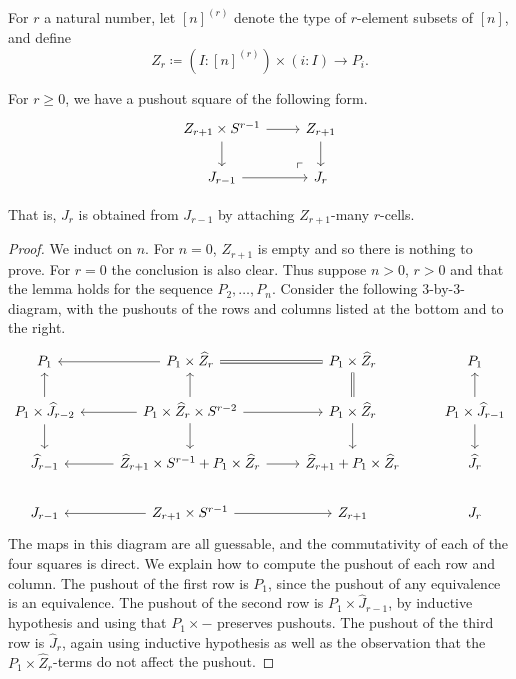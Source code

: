 \begin{definition}
For $r$ a natural number, let
$[n]^{(r)}$ denote the type of $r$-element subsets of $[n]$, and
define
\[
Z_r \coloneqq (I : [n]^{(r)}) \times (i : I) \to P_i.
\]
\end{definition}
\begin{lemma}\label{cw}
For $r \ge 0$, we have a pushout square of the following form.
\[
\begin{tikzcd}
Z_{r+1} \times S^{r-1} \arrow[r] \arrow[d]
	& Z_{r+1} \arrow[d] \\
	J_{r-1} \arrow[r] &
	J_r
	\arrow[ul, phantom, "\ulcorner" , very near start]
\end{tikzcd}
\]
\end{lemma}
That is, $J_r$ is obtained from $J_{r-1}$ by attaching $Z_{r+1}$-many $r$-cells.
\begin{proof}
We induct on $n$. For $n = 0$, $Z_{r+1}$ is empty and so there is nothing to prove.
For $r = 0$ the conclusion is also clear.
Thus suppose $n > 0$, $r > 0$ and that the lemma holds for the sequence $P_2, \ldots, P_n$.
Consider the following 3-by-3-diagram, with the pushouts of the rows and columns listed
at the bottom and to the right.
\[
\begin{tikzcd}
 P_1 &
 P_1 \times \widehat Z_r \arrow[l] \arrow[r,equal]&
 P_1 \times \widehat Z_r &
 P_1 \\
 P_1 \times \widehat J_{r-2} \arrow[u] \arrow[d] &
 P_1 \times \widehat Z_r \times S^{r-2} \arrow[l] \arrow[r] \arrow[u] \arrow[d] &
 P_1 \times \widehat Z_r  \arrow[u,equal] \arrow[d] &
 P_1 \times \widehat J_{r-1} \arrow[u] \arrow[d] \\
 \widehat J_{r-1} &
 \widehat Z_{r+1} \times S^{r-1} + P_1 \times \widehat Z_r  \arrow[l] \arrow[r] &
 \widehat Z_{r+1} + P_1 \times \widehat Z_r &
 \widehat J_r \\
	 J_{r-1} & 
	 Z_{r+1} \times S^{r-1} \arrow[l] \arrow[r] & 
	 Z_{r+1} & J_r
\end{tikzcd}
\]
The maps in this diagram are all guessable, and the commutativity of each of
the four squares is direct. We explain how to compute the pushout of each row and column.
The pushout of the first row is $P_1$, since
the pushout of any equivalence is an equivalence.
The pushout of the second row is $P_1 \times \widehat J_{r-1}$,
by inductive hypothesis and using that $P_1 \times -$ preserves pushouts.
The pushout of the third row is $\widehat J_r$, again using inductive hypothesis
as well as the observation that the $P_1 \times \widehat Z_r$-terms do not
affect the pushout.


\end{proof}
